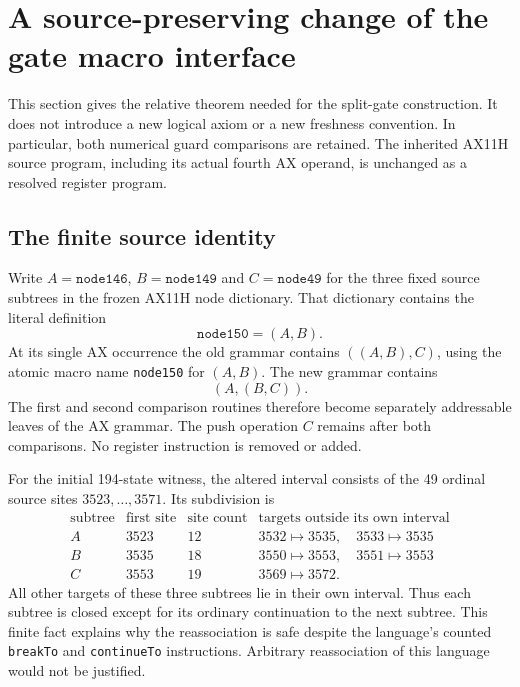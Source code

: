 \section{A source-preserving change of the gate macro interface}
\label{sec:gate-relative}

This section gives the relative theorem needed for the split-gate
construction.  It does not introduce a new logical axiom or a new
freshness convention.  In particular, both numerical guard comparisons
are retained.  The inherited AX11H source program, including its actual
fourth AX operand, is unchanged as a resolved register program.

\subsection{The finite source identity}

Write $A=\mathtt{node146}$, $B=\mathtt{node149}$ and
$C=\mathtt{node49}$ for the three fixed source subtrees in the frozen
AX11H node dictionary.  That dictionary contains the literal definition
\[
 \mathtt{node150}=(A,B).
\]
At its single AX occurrence the old grammar contains
$((A,B),C)$, using the atomic macro name \texttt{node150} for $(A,B)$.
The new grammar contains
\[
                  (A,(B,C)).                                  \tag{G1}
\]
The first and second comparison routines therefore become separately
addressable leaves of the AX grammar.  The push operation $C$ remains
after both comparisons.  No register instruction is removed or added.

For the initial 194-state witness, the altered interval consists of the
49 ordinal source sites $3523,\ldots,3571$.  Its subdivision is
\[
\begin{array}{c|r|r|l}
\text{subtree}&\text{first site}&\text{site count}&
 \text{targets outside its own interval}\\ \hline
A&3523&12&3532\mapsto3535,\quad3533\mapsto3535\\
B&3535&18&3550\mapsto3553,\quad3551\mapsto3553\\
C&3553&19&3569\mapsto3572.
\end{array}                                                    \tag{G2}
\]
All other targets of these three subtrees lie in their own interval.
Thus each subtree is closed except for its ordinary continuation to the
next subtree.  This finite fact explains why the reassociation is safe
despite the language's counted \texttt{breakTo} and
\texttt{continueTo} instructions.  Arbitrary reassociation of this
language would not be justified.

